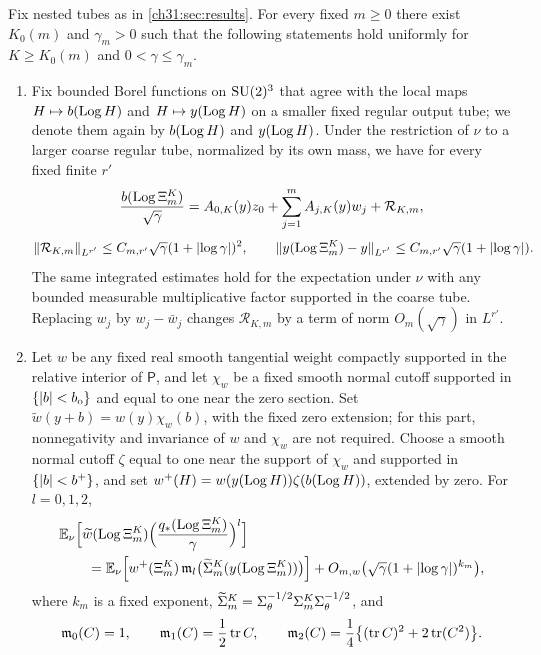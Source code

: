\begin{theorem}\label{ch31:thm:prefix-moments-no-return}
Fix nested tubes as in \cref{ch31:sec:results}. For every fixed $m\ge0$ there exist $K_0(m)$ and $\gamma_m>0$ such that the following statements hold uniformly for $K\ge K_0(m)$ and $0<\gamma\le\gamma_m$.
\begin{enumerate}
\item Fix bounded Borel functions on $\mathrm{SU}(2)^3$ that agree with the local maps $H\mapsto b(\operatorname{Log} H)$ and $H\mapsto y(\operatorname{Log} H)$ on a smaller fixed regular output tube; we denote them again by $b(\operatorname{Log} H)$ and $y(\operatorname{Log} H)$. Under the restriction of $\nu$ to a larger coarse regular tube, normalized by its own mass, we have for every fixed finite $r'$
\[
 \frac{b(\operatorname{Log}\Xi_m^K)}{\sqrt\gamma}=A_{0,K}(y)z_0+\sum_{j=1}^mA_{j,K}(y)w_j+\mathcal R_{K,m},
\]
\[
 \lVert \mathcal R_{K,m}\rVert_{L^{r'}}\le C_{m,r'}\sqrt\gamma(1+\lvert \log\gamma\rvert)^2,\qquad
 \lVert y(\operatorname{Log}\Xi_m^K)-y\rVert_{L^{r'}}\le C_{m,r'}\sqrt\gamma(1+\lvert \log\gamma\rvert).
\]
The same integrated estimates hold for the expectation under $\nu$ with any bounded measurable multiplicative factor supported in the coarse tube. Replacing $w_j$ by $w_j-\bar w_j$ changes $\mathcal R_{K,m}$ by a term of norm $O_m(\sqrt\gamma)$ in $L^{r'}$.
\item Let $w$ be any fixed real smooth tangential weight compactly supported in the relative interior of $\mathsf P$, and let $\chi_w$ be a fixed smooth normal cutoff supported in $\{\lvert b\rvert<b_{\rm o}\}$ and equal to one near the zero section. Set $\widetilde w(y+b)=w(y)\chi_w(b)$, with the fixed zero extension; for this part, nonnegativity and invariance of $w$ and $\chi_w$ are not required. Choose a smooth normal cutoff $\zeta$ equal to one near the support of $\chi_w$ and supported in $\{\lvert b\rvert<b^+\}$, and set $w^+(H)=w(y(\operatorname{Log} H))\zeta(b(\operatorname{Log} H))$, extended by zero. For $l=0,1,2$,
\[
 \begin{split}
 &\mathbb E_\nu\Bigl[\widetilde w(\operatorname{Log}\Xi_m^K)\Bigl(\frac{q_*(\operatorname{Log}\Xi_m^K)}\gamma\Bigr)^l\Bigr]\\
 &\qquad=\mathbb E_\nu\Bigl[w^+(\Xi_m^K)\,\mathfrak m_l\bigl(\widetilde\Sigma_m^K(y(\operatorname{Log}\Xi_m^K))\bigr)\Bigr]+O_{m,w}\bigl(\sqrt\gamma(1+\lvert \log\gamma\rvert)^{k_m}\bigr),
 \end{split}
\]
where $k_m$ is a fixed exponent, $\widetilde\Sigma_m^K=\Sigma_\theta^{-1/2}\Sigma_m^K\Sigma_\theta^{-1/2}$, and
\begin{equation}\label{ch31:eq:moment-polynomials}
 \mathfrak m_0(C)=1,\qquad\mathfrak m_1(C)=\frac12\tr C,\qquad\mathfrak m_2(C)=\frac14\bigl\{(\tr C)^2+2\tr(C^2)\bigr\}.

\end{equation}
\end{enumerate}
\end{theorem}
